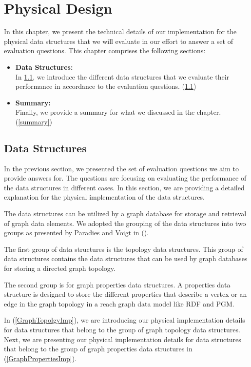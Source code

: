 {\chapter{Physical Design}
\label{chap:PhysicalDesign}
In this chapter, we present the technical details of our implementation for the physical data structures that we will evaluate in our effort to answer a set of evaluation questions. This chapter comprises the following sections:


\begin{itemize}  
\item\textbf{Data Structures:}\\
In \ref{dataStructs}, we introduce the different data structures that we evaluate their performance in accordance to the evaluation questions. (\ref{dataStructs})
\item \textbf{Summary:}\\
Finally, we provide a summary for what we discussed in the chapter. (\ref{summary})
\end{itemize}
 
\section{Data Structures}
\label{dataStructs}

In the previous section, we presented the set of evaluation questions we aim to provide answers for. The questions are focusing on evaluating the performance of the data structures in different cases. In this section, we are providing a detailed explanation for the physical implementation of the data structures.

The data structures can be utilized by a graph database for storage and retrieval of graph data elements. We adopted the grouping of the data structures into two groups as presented by Paradies and Voigt in (\cite{Paradies2017}). 

The first group of data structures is the topology data structures. This group of data structures contains the data structures that can be used by graph databases for storing a directed graph topology.

The second group is for graph properties data structures. A properties data structure is designed to store the different properties that describe a vertex or an edge in the graph topology in a reach graph data model like RDF and PGM.

In (\ref{GraphTopolgyImp}), we are introducing our physical implementation details for data structures that belong to the group of graph topology data structures. Next, we are presenting our physical implementation details for data structures that belong to the group of graph properties data structures in (\ref{GraphPropertiesImp}).


}
